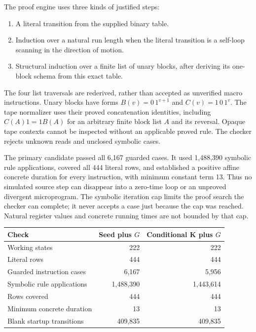 The proof engine uses three kinds of justified steps:
\begin{enumerate}
\item A literal transition from the supplied binary table.
\item Induction over a natural run length when the literal transition
      is a self-loop scanning in the direction of motion.
\item Structural induction over a finite list of unary blocks, after
      deriving its one-block schema from this exact table.
\end{enumerate}
The four list traversals are rederived, rather than accepted as
unverified macro instructions. Unary blocks have forms
$B(v)=0\,1^{v+1}$ and $C(v)=1\,0\,1^v$. The tape normalizer uses
their proved concatenation identities, including
$C(A)1=1B(A)$ for an arbitrary finite block list $A$ and its reversal.
Opaque tape contexts cannot be inspected without an applicable proved
rule. The checker rejects unknown reads and unclosed symbolic cases.

The primary candidate passed all 6,167 guarded cases. It used
1,488,390 symbolic rule applications, covered all 444 literal rows,
and established a positive affine concrete duration for every
instruction, with minimum constant term 13. Thus no simulated source
step can disappear into a zero-time loop or an unproved divergent
microprogram. The symbolic iteration cap limits the proof search the
checker can complete; it never accepts a case just because the cap
was reached. Natural register values and concrete running times are
not bounded by that cap.

\begin{center}
\begin{tabular}{lrr}
\toprule
Check & Seed plus $G$ & Conditional K plus $G$\\
\midrule
Working states & 222 & 222\\
Literal rows & 444 & 444\\
Guarded instruction cases & 6,167 & 5,956\\
Symbolic rule applications & 1,488,390 & 1,443,614\\
Rows covered & 444 & 444\\
Minimum concrete duration & 13 & 13\\
Blank startup transitions & 409,835 & 409,835\\
\bottomrule
\end{tabular}
\end{center}


